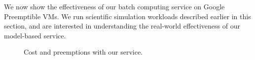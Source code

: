 We now show the effectiveness of our batch computing service on Google Preemptible VMs.
We run scientific simulation workloads described earlier in this section, and are interested in understanding the real-world effectiveness of our model-based service.







\begin{figure}[t]
  \vspace*{\myfigspace}
  \centering
\hfill
{}
\label{fig:service-all}
\vspace*{-0.4cm}
\caption{Cost and preemptions with our service.}
\vspace*{\myfigspace}
\end{figure}  



